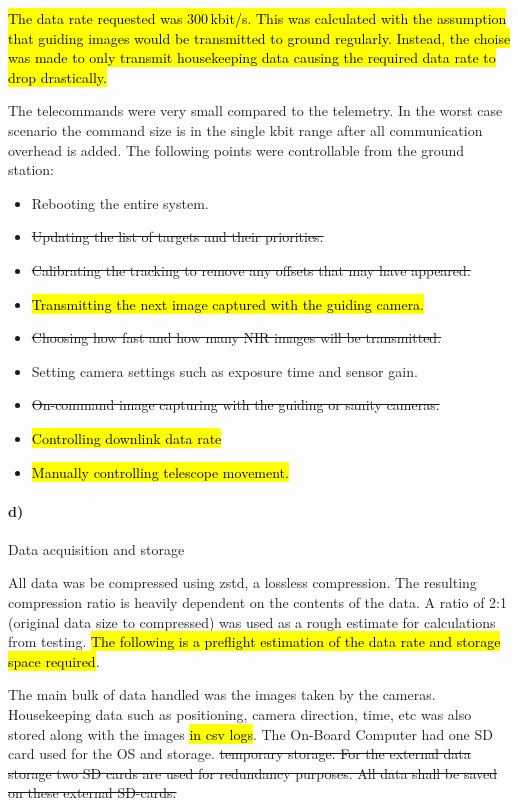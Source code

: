 \hl{The data rate requested was 300\,kbit/s. This was calculated with the assumption that guiding images would be transmitted to ground regularly. Instead, the choise was made to only transmit housekeeping data causing the required data rate to drop drastically.}

The telecommands were very small compared to the telemetry. In the worst case scenario the command size is in the single kbit range after all communication overhead is added. The following points were controllable from the ground station:

\begin{itemize}
    \item Rebooting the entire system.
    \item \st{Updating the list of targets and their priorities.}
    \item \st{Calibrating the tracking to remove any offsets that may have appeared.}
    \item \hl{Transmitting the next image captured with the guiding camera.}
    \item \st{Choosing how fast and how many NIR images will be transmitted.}
    \item Setting camera settings such as exposure time and sensor gain.
    \item \st{On-command image capturing with the guiding or sanity cameras.}
    \item \hl{Controlling downlink data rate}
    \item \hl{Manually controlling telescope movement.}
\end{itemize}

\paragraph{d)} Data acquisition and storage

All data was be compressed using zstd, a lossless compression. The resulting compression ratio is heavily dependent on the contents of the data. A ratio of 2:1 (original data size to compressed) was used as a rough estimate for calculations from testing. \hl{The following is a preflight estimation of the data rate and storage space required}.

The main bulk of data handled was the images taken by the cameras. Housekeeping data such as positioning, camera direction, time, etc was also stored along with the images \hl{in csv logs}. The On-Board Computer had one SD card used for the OS and storage. \st{temporary storage. For the external data storage two SD cards are used for redundancy purposes. All data shall be saved on these external SD-cards.}

